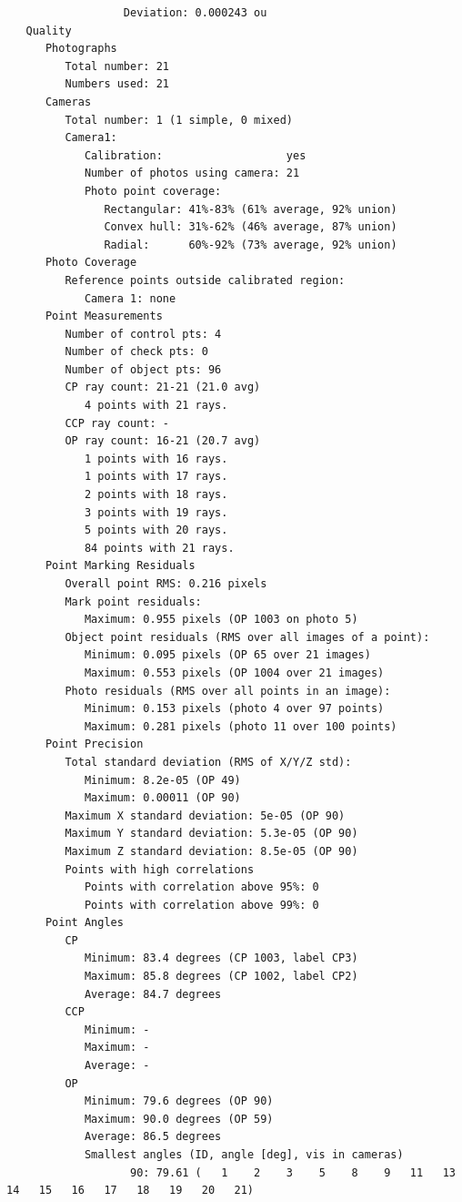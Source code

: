 \documentclass{article}
\begin{document}
\begin{verbatim}
                  Deviation: 0.000243 ou
   Quality
      Photographs
         Total number: 21
         Numbers used: 21
      Cameras
         Total number: 1 (1 simple, 0 mixed)
         Camera1:
            Calibration:                   yes
            Number of photos using camera: 21
            Photo point coverage:
               Rectangular: 41%-83% (61% average, 92% union)
               Convex hull: 31%-62% (46% average, 87% union)
               Radial:      60%-92% (73% average, 92% union)
      Photo Coverage
         Reference points outside calibrated region:
            Camera 1: none
      Point Measurements
         Number of control pts: 4
         Number of check pts: 0
         Number of object pts: 96
         CP ray count: 21-21 (21.0 avg)
            4 points with 21 rays.
         CCP ray count: -
         OP ray count: 16-21 (20.7 avg)
            1 points with 16 rays.
            1 points with 17 rays.
            2 points with 18 rays.
            3 points with 19 rays.
            5 points with 20 rays.
            84 points with 21 rays.
      Point Marking Residuals
         Overall point RMS: 0.216 pixels
         Mark point residuals:
            Maximum: 0.955 pixels (OP 1003 on photo 5)
         Object point residuals (RMS over all images of a point):
            Minimum: 0.095 pixels (OP 65 over 21 images)
            Maximum: 0.553 pixels (OP 1004 over 21 images)
         Photo residuals (RMS over all points in an image):
            Minimum: 0.153 pixels (photo 4 over 97 points)
            Maximum: 0.281 pixels (photo 11 over 100 points)
      Point Precision
         Total standard deviation (RMS of X/Y/Z std):
            Minimum: 8.2e-05 (OP 49)
            Maximum: 0.00011 (OP 90)
         Maximum X standard deviation: 5e-05 (OP 90)
         Maximum Y standard deviation: 5.3e-05 (OP 90)
         Maximum Z standard deviation: 8.5e-05 (OP 90)
         Points with high correlations
            Points with correlation above 95%: 0
            Points with correlation above 99%: 0
      Point Angles
         CP
            Minimum: 83.4 degrees (CP 1003, label CP3)
            Maximum: 85.8 degrees (CP 1002, label CP2)
            Average: 84.7 degrees
         CCP
            Minimum: -
            Maximum: -
            Average: -
         OP
            Minimum: 79.6 degrees (OP 90)
            Maximum: 90.0 degrees (OP 59)
            Average: 86.5 degrees
            Smallest angles (ID, angle [deg], vis in cameras)
                   90: 79.61 (   1    2    3    5    8    9   11   13   14   15   16   17   18   19   20   21)

\end{verbatim}
\end{document}
